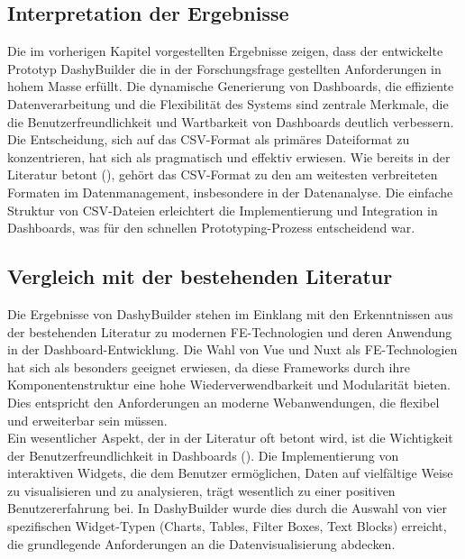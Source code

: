 \documentclass[a4paper, 12pt]{scrartcl}
\begin{document}
\subsection{Interpretation der Ergebnisse}
Die im vorherigen Kapitel vorgestellten Ergebnisse zeigen, dass der entwickelte Prototyp DashyBuilder die in der Forschungsfrage gestellten Anforderungen in hohem Masse erfüllt. Die dynamische Generierung von Dashboards, die effiziente Datenverarbeitung und die Flexibilität des Systems sind zentrale Merkmale, die die Benutzerfreundlichkeit und Wartbarkeit von Dashboards deutlich verbessern.\\[1em]Die Entscheidung, sich auf das \ac{CSV}-Format als primäres Dateiformat zu konzentrieren, hat sich als pragmatisch und effektiv erwiesen. Wie bereits in der Literatur betont (\cite{Freeman2019}), gehört das \ac{CSV}-Format zu den am weitesten verbreiteten Formaten im Datenmanagement, insbesondere in der Datenanalyse. Die einfache Struktur von \ac{CSV}-Dateien erleichtert die Implementierung und Integration in Dashboards, was für den schnellen Prototyping-Prozess entscheidend war.

\subsection{Vergleich mit der bestehenden Literatur}
Die Ergebnisse von DashyBuilder stehen im Einklang mit den Erkenntnissen aus der bestehenden Literatur zu modernen \ac{FE}-Technologien und deren Anwendung in der Dashboard-Entwicklung. Die Wahl von \ac{Vue} und \ac{Nuxt} als \ac{FE}-Technologien hat sich als besonders geeignet erwiesen, da diese Frameworks durch ihre Komponentenstruktur eine hohe Wiederverwendbarkeit und Modularität bieten. Dies entspricht den Anforderungen an moderne Webanwendungen, die flexibel und erweiterbar sein müssen.\\[1em]Ein wesentlicher Aspekt, der in der Literatur oft betont wird, ist die Wichtigkeit der Benutzerfreundlichkeit in Dashboards (\cite{Desai2016}). Die Implementierung von interaktiven Widgets, die dem Benutzer ermöglichen, Daten auf vielfältige Weise zu visualisieren und zu analysieren, trägt wesentlich zu einer positiven Benutzererfahrung bei. In DashyBuilder wurde dies durch die Auswahl von vier spezifischen Widget-Typen (Charts, Tables, Filter Boxes, Text Blocks) erreicht, die grundlegende Anforderungen an die Datenvisualisierung abdecken.
\end{document}
